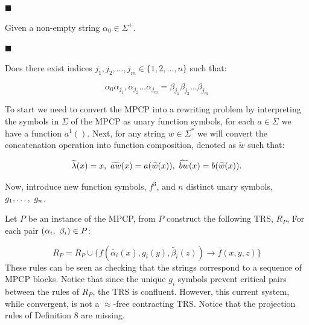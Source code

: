 \par\noindent  $\blacksquare$ 
 
Given a non-empty string $\alpha_{0}\in\Sigma^{+}$.\par
 
 
 
\par\noindent  $\blacksquare$ 
 
Does there exist indices $j_{1},j_{2},\ldots,j_{m}\in\{1,2,\ldots,n\}$ such that:\par
    \[\alpha_{0}\alpha_{j_{1}},\alpha_{j_{2}}\ldots\alpha_{j_{m}}=\beta_{j_{1}}\beta%
_{j_{2}}\ldots\beta_{j_{m}}\]    
 
  
 
 
To start we need to convert the MPCP into a rewriting problem by interpreting the symbols in $\Sigma$ of the MPCP as unary function symbols, for each $a\in\Sigma$ we have a function $a^{1}()$. Next, for any string $w\in\Sigma^{*}$ we will convert the concatenation operation into function composition, denoted as $\widetilde{w}$ such that:\par
    \[\widetilde{\lambda}(x)=x,\leavevmode\nobreak\ \widetilde{aw}(x)=a(\widetilde{w%
}(x)),\leavevmode\nobreak\ \widetilde{bw}(x)=b(\widetilde{w}(x)).\]    
 
 
Now, introduce new function symbols, $f^{3}$, and $n$ distinct unary symbols, $g_{1},\ldots,\leavevmode\nobreak\ g_{n}$.\par
 
 
 
Let $P$ be an instance of the MPCP, from $P$ construct the following TRS, $R_{P}$, For each pair $(\alpha_{i},\leavevmode\nobreak\ \beta_{i})\in P$:\par
    \[R_{P}=R_{P}\cup\{f(\widetilde{\alpha_{i}}(x),g_{i}(y),\widetilde{\beta_{i}}(z)%
)\rightarrow f(x,y,z)\}\]    
These rules can be seen as checking that the strings correspond to a sequence of MPCP blocks. Notice that since the unique $g_{i}$ symbols prevent critical pairs between the rules of $R_{P}$, the TRS is confluent. However, this current system, while convergent, is not a $\approx$-free contracting TRS. Notice that the projection rules of Definition 8 are missing.\par
 
